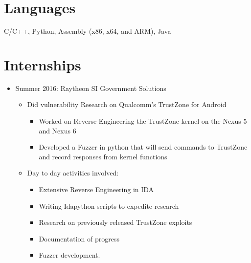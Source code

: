 \documentclass[font = 23,a4paper,sans]{moderncv}
\date{}
\begin{document}
\maketitle

\section{Languages}
C/C++, Python, Assembly (x86, x64, and ARM), Java
        
\section{Internships}
\label{sec:Internships}
\begin{itemize}
    \item Summer 2016: Raytheon SI Government Solutions
        \begin{itemize}
            \item Did vulnerability Research on Qualcomm's TrustZone for Android 
                \begin{itemize}
                        \item Worked on Reverse Engineering the TrustZone kernel on the Nexus 5 and Nexus 6 

                        \item Developed a Fuzzer in python that will send commands to TrustZone and record responses from kernel functions 
                \end{itemize}
            \item  Day to day activities involved: 
            \begin{itemize} 
                \item Extensive Reverse Engineering in IDA 
                \item Writing Idapython scripts to expedite research 
                \item Research on previously released TrustZone exploits 
                \item Documentation of progress 
                \item Fuzzer development. 
            \end{itemize}
        \end{itemize}
\end{itemize}
\end{document}
